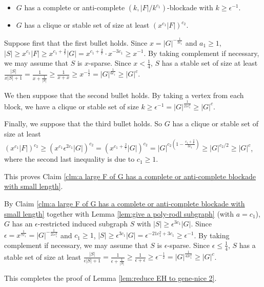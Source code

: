 \documentclass[a4paper,11pt]{article}
\let\oldendproof\endproof
\renewenvironment{proof}[1][\proofname]{%
	\oldproof[\normalfont\bfseries #1]%
}{\oldendproof}
\renewcommand{\qedsymbol}{$\square$}%
\newenvironment{subproof}[1][\normalfont\it Subproof]{%
	\renewcommand{\qedsymbol}{{\tiny{$\blacksquare$}}}%
	\begin{proof}[#1]%
	}{%
	\end{proof}%
}
\begin{document}
\begin{proof}
\begin{subproof}[Proof of Claim \ref{clm:a large F of G has a complete or anti-complete blockade with small length}]
\begin{itemize}
                \item $G$ has a complete or anti-complete $(k,|F|/k^{c_1})$-blockade with $k\geq \epsilon^{-1}$.
            
                \item $G$ has a clique or stable set of size at least $(x^{c_1}|F|)^{c_2}$. 
            \end{itemize}
            
            Suppose first that the first bullet holds. 
            Since $x=|G|^{-\frac{1}{3c_1}}$ and $a_1\geq 1$, $|S|\geq x^{c_1}|F|\geq x^{c_1+\frac{2}{7}}|G|=x^{c_1+\frac{2}{7}}\cdot x^{-3c_1}\geq x^{-1}$. 
            By taking complement if necessary, we may assume that $S$ is $x$-sparse.  
            Since $x<\frac{1}{4}$, $S$ has a stable set of size at least $\frac{|S|}{x|S|+1}=\frac{1}{x+\frac{1}{|S|}}\geq \frac{1}{x+x}\geq x^{-\frac{1}{2}}=|G|^{\frac{1}{6c_1}}\geq |G|^c$. 

            We then suppose that the second bullet holds. 
            By taking a vertex from each block, we have a clique or stable set of size $k\geq\epsilon^{-1}=|G|^{\frac{1}{21c_1^2}}\geq |G|^c$. 

            Finally, we suppose that the third bullet holds. 
            So $G$ has a clique or stable set of size at least $(x^{c_1}|F|)^{c_2}\geq (x^{c_1}\epsilon^{2c_1}|G|)^{c_2}=(x^{c_1+\frac{2}{7}}|G|)^{c_2}= |G|^{c_2(1-\frac{c_1+\frac{2}{7}}{3c_1})}\geq |G|^{c_2/2}\geq |G|^{c}$, where the second last inequality is due to $c_1\geq 1$.

            This proves Claim \ref{clm:a large F of G has a complete or anti-complete blockade with small length}. 
        \end{subproof}

        By Claim \ref{clm:a large F of G has a complete or anti-complete blockade with small length} together with Lemma \ref{lem:give a poly-rodl subgraph} (with $a=c_1$), $G$ has an $\epsilon$-restricted induced subgraph $S$ with $|S|\geq \epsilon^{3c_1}|G|$.
        Since $\epsilon=x^{\frac{1}{7c_1}}=|G|^{-\frac{1}{21c_1^2}}$ and $c_1\geq 1$, $|S|\geq \epsilon^{3c_1}|G|=\epsilon^{-21c_1^2+3c_1}\geq \epsilon^{-1}$.
        By taking complement if necessary, we may assume that $S$ is $\epsilon$-sparse. 
        Since $\epsilon\leq \frac{1}{4}$, $S$ has a stable set of size at least $\frac{|S|}{\epsilon|S|+1}=\frac{1}{\epsilon+\frac{1}{|S|}}\geq \frac{1}{\epsilon+\epsilon}\geq \epsilon^{-\frac{1}{2}}=|G|^{\frac{1}{42c_1^2}}\geq |G|^c$.
        
        This completes the proof of Lemma \ref{lem:reduce EH to gene-nice 2}. 
    \end{proof}
\end{document}

